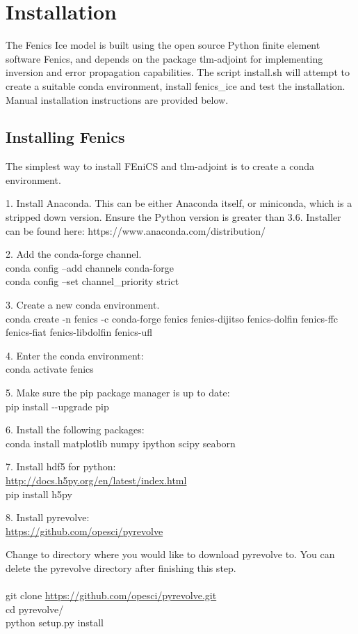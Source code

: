 \documentclass[11pt, reqno, nocenter]{article}
\begin{document}
\section{Installation}

The Fenics Ice model is built using the open source Python finite element software Fenics, and depends on the package tlm-adjoint for implementing inversion and error propagation capabilities. The script install.sh will attempt to create a suitable conda environment, install fenics\_ice and test the installation. Manual installation instructions are provided below.

\subsection{Installing Fenics}

The simplest way to install FEniCS and tlm-adjoint is to create a conda environment. 
 
1. Install Anaconda. This can be either Anaconda itself, or miniconda, which is a stripped down version. Ensure the Python version is greater than 3.6. Installer can be found here: https://www.anaconda.com/distribution/ 

2. Add the conda-forge channel. \\
conda config --add channels conda-forge \\
conda config --set channel\_priority strict

3. Create a new conda environment. \\
conda create -n fenics -c conda-forge fenics fenics-dijitso fenics-dolfin fenics-ffc fenics-fiat fenics-libdolfin fenics-ufl

4. Enter the conda environment: \\
conda activate fenics

5. Make sure the pip package manager is up to date: \\
pip install -{}-upgrade pip

6. Install the following packages: \\
conda install matplotlib numpy ipython scipy seaborn

7. Install hdf5 for python: \\
\url{http://docs.h5py.org/en/latest/index.html} \\
pip install h5py

8. Install pyrevolve: \\
\url{https://github.com/opesci/pyrevolve}

Change to directory where you would like to download pyrevolve to. You can delete the pyrevolve directory after finishing this step. \\ \\
git clone \url{https://github.com/opesci/pyrevolve.git} \\
cd pyrevolve/ \\
python setup.py install
\end{document}
